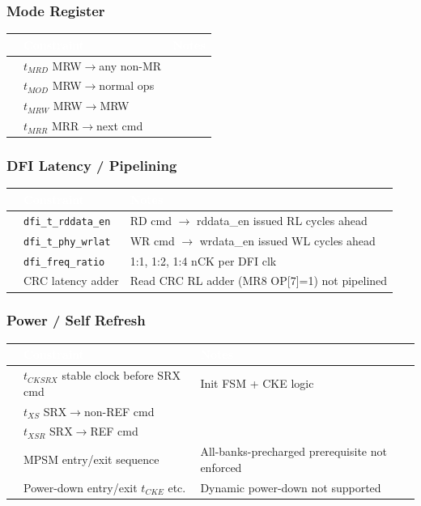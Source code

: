 \documentclass[11pt,a4paper]{article}
\newcommand{\THead}[1]{\cellcolor{navy}\textcolor{white}{\small\textbf{#1}}}
\newcommand{\RA}{\rowcolor{lgray}}
\newcommand{\RB}{\rowcolor{sky!30}}
\newcommand{\cmark}{\textcolor{grn}{\ding{51}}}
\newcommand{\xmark}{\textcolor{red}{\ding{55}}}
\begin{document}
\subsubsection*{Mode Register}
\begin{center}
\begin{tabularx}{\linewidth}{@{} c l X @{}}
\toprule
\THead{} & \THead{Constraint} & \THead{Notes} \\
\midrule
\RA\cmark & $t_{MRD}$ MRW$\to$any non-MR & \\
\RB\cmark & $t_{MOD}$ MRW$\to$normal ops & \\
\RA\cmark & $t_{MRW}$ MRW$\to$MRW & \\
\RB\cmark & $t_{MRR}$ MRR$\to$next cmd & \\
\bottomrule
\end{tabularx}
\end{center}

\subsubsection*{DFI Latency / Pipelining}
\begin{center}
\begin{tabularx}{\linewidth}{@{} c l X @{}}
\toprule
\THead{} & \THead{Constraint} & \THead{Notes} \\
\midrule
\RA\cmark & \texttt{dfi\_t\_rddata\_en} &
  RD cmd $\to$ rddata\_en issued RL cycles ahead \\
\RB\cmark & \texttt{dfi\_t\_phy\_wrlat} &
  WR cmd $\to$ wrdata\_en issued WL cycles ahead \\
\RA\cmark & \texttt{dfi\_freq\_ratio} &
  1:1, 1:2, 1:4 nCK per DFI clk \\
\RB\xmark & CRC latency adder &
  Read CRC RL adder (MR8 OP[7]=1) not pipelined \\
\bottomrule
\end{tabularx}
\end{center}

\subsubsection*{Power / Self Refresh}
\begin{center}
\begin{tabularx}{\linewidth}{@{} c l X @{}}
\toprule
\THead{} & \THead{Constraint} & \THead{Notes} \\
\midrule
\RA\cmark & $t_{CKSRX}$ stable clock before SRX cmd & Init FSM + CKE logic \\
\RB\cmark & $t_{XS}$ SRX$\to$non-REF cmd & \\
\RA\cmark & $t_{XSR}$ SRX$\to$REF cmd & \\
\RB\xmark & MPSM entry/exit sequence &
  All-banks-precharged prerequisite not enforced \\
\RA\xmark & Power-down entry/exit $t_{CKE}$ etc. &
  Dynamic power-down not supported \\
\bottomrule
\end{tabularx}
\end{center}
\end{document}
